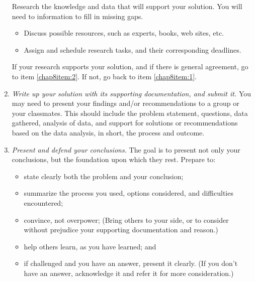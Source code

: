 \begin{enumerate}
Research the knowledge and data that will support your solution.
You will need to information to fill in missing gaps.
	\begin{itemize}
	\item Discuss possible resources, such as experts, books, web sites, etc.
	\item Assign and schedule research tasks, and their corresponding deadlines.
	\end{itemize}
If your research supports your solution, and if there is general agreement, go to item \eqref{chap8item:2}.
If not, go back to item \eqref{chap8item:1}.

\item \label{chap8item:2}\textit{Write up your solution with its supporting documentation, and submit it.} You may need to present your findings and/or recommendations to a group or your
classmates. This should include the problem statement, questions, data gathered, analysis of data, and
support for solutions or recommendations based on the data analysis, in short, the process
and outcome.

\item \textit{Present and defend your conclusions.} The goal is to present not only your conclusions, but the foundation upon which they
rest. Prepare to:
	\begin{itemize}
	\item state clearly both the problem and your conclusion;
	\item summarize the process you used, options considered, and difficulties encountered;
	\item convince, not overpower;
	(Bring others to your side, or to consider without prejudice your supporting
	documentation and reason.)
	\item help others learn, as you have learned; and
	\item if challenged and you have an answer, present it clearly.
	(If you don't have an answer, acknowledge it and refer it for more consideration.)
	\end{itemize}
\end{enumerate}
